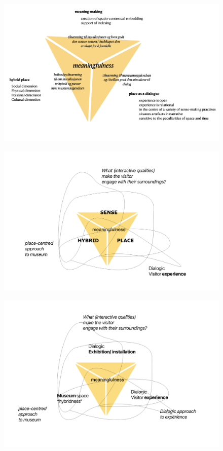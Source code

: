 \begin{figure}[h]
\centering 
\includegraphics[width=13cm]{pictures/meaningfullness_triangle.png}
\caption{}
\end{figure}


\begin{figure}[h]
\centering 
\includegraphics[width=13cm]{pictures/Theory/early_iteration_framework.png}
\caption{}
\end{figure}

\begin{figure}[h]
\centering 
\includegraphics[width=13cm]{pictures/Theory/meaningfulness_triangle.png}
\caption{}
\end{figure}

